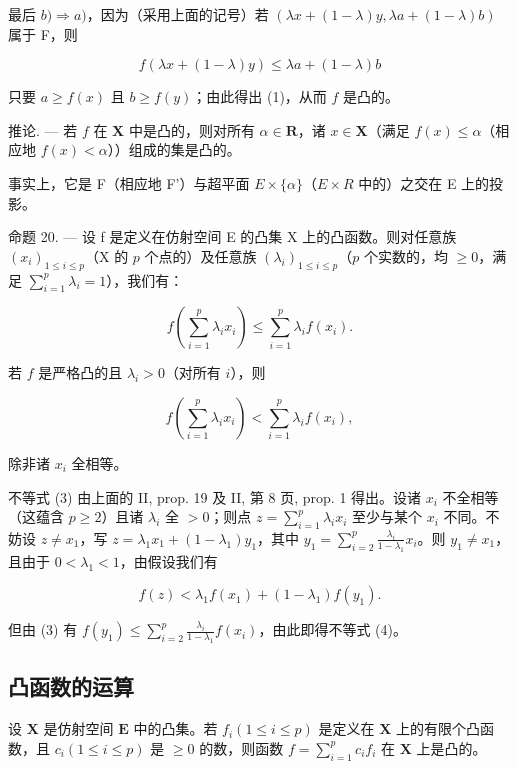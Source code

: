 最后 \(b) \Rightarrow a)\)，因为（采用上面的记号）若 \((\lambda x + (1 - \lambda)y, \lambda a + (1 - \lambda)b)\) 属于 F，则

\[
f (\lambda x + (1 - \lambda) y) \leqslant \lambda a + (1 - \lambda) b
\]

只要 \(a \geqslant f(x)\) 且 \(b \geqslant f(y)\)；由此得出 (1)，从而 \(f\) 是凸的。

推论. --- 若 \(f\) 在 \(\mathbf{X}\) 中是凸的，则对所有 \(\alpha \in \mathbf{R}\)，诸 \(x \in \mathbf{X}\)（满足 \(f(x) \leqslant \alpha\)（相应地 \(f(x) < \alpha\)））组成的集是凸的。

事实上，它是 F（相应地 F'）与超平面 \(E \times \{\alpha\}\)（\(E \times R\) 中的）之交在 E 上的投影。

命题 20. --- 设 f 是定义在仿射空间 E 的凸集 X 上的凸函数。则对任意族 \((x_{i})_{1\leqslant i\leqslant p}\)（X 的 \(p\) 个点的）及任意族 \((\lambda_{i})_{1\leqslant i\leqslant p}\)（\(p\) 个实数的，均 \(\geqslant 0\)，满足 \(\sum_{i = 1}^{p}\lambda_{i} = 1\)），我们有：

\[
f \left(\sum_ {i = 1} ^ {p} \lambda_ {i} x _ {i}\right) \leqslant \sum_ {i = 1} ^ {p} \lambda_ {i} f \left(x _ {i}\right).\tag{3}
\]

若 \(f\) 是严格凸的且 \(\lambda_i > 0\)（对所有 \(i\)），则

\[
f \left(\sum_ {i = 1} ^ {p} \lambda_ {i} x _ {i}\right) <   \sum_ {i = 1} ^ {p} \lambda_ {i} f \left(x _ {i}\right),\tag{4}
\]

除非诸 \(x_{i}\) 全相等。

不等式 (3) 由上面的 II, prop. 19 及 II, 第 8 页, prop. 1 得出。设诸 \(x_{i}\) 不全相等（这蕴含 \(p \geqslant 2\)）且诸 \(\lambda_{i}\) 全 \(>0\)；则点 \(z = \sum_{i=1}^{p} \lambda_{i} x_{i}\) 至少与某个 \(x_{i}\) 不同。不妨设 \(z \neq x_{1}\)，写 \(z = \lambda_{1} x_{1} + (1 - \lambda_{1}) y_{1}\)，其中 \(y_{1} = \sum_{i=2}^{p} \frac{\lambda_{i}}{1 - \lambda_{1}} x_{i}\)。则 \(y_{1} \neq x_{1}\)，且由于 \(0 < \lambda_{1} < 1\)，由假设我们有

\[
f (z) <   \lambda_ {1} f (x _ {1}) + (1 - \lambda_ {1}) f (y _ {1}).
\]

但由 (3) 有 \(f(y_{1}) \leqslant \sum_{i=2}^{p} \frac{\lambda_{i}}{1 - \lambda_{1}} f(x_{i})\)，由此即得不等式 (4)。

\subsection{凸函数的运算}

设 \(\mathbf{X}\) 是仿射空间 \(\mathbf{E}\) 中的凸集。若 \(f_{i}(1 \leqslant i \leqslant p)\) 是定义在 \(\mathbf{X}\) 上的有限个凸函数，且 \(c_{i} (1 \leqslant i \leqslant p)\) 是 \(\geqslant 0\) 的数，则函数 \(f = \sum_{i=1}^{p} c_{i} f_{i}\) 在 \(\mathbf{X}\) 上是凸的。

